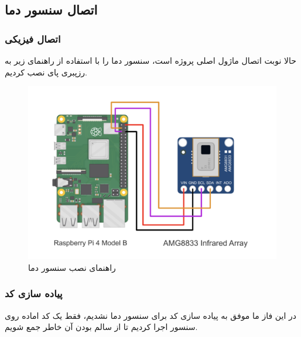 \documentclass[12pt]{article}
\begin{document}
\newpage

\subsection{اتصال سنسور دما}

\subsubsection{اتصال فیزیکی}

حالا نوبت اتصال ماژول اصلی پروژه است، سنسور دما را با استفاده از راهنمای زیر به رزپبری پای نصب کردیم.

\begin{figure}[h]
	\begin{center}
		\includegraphics[width=.75\textwidth]{images/amg8833_RPi4_wiring.png}
	\end{center}
	\caption{راهنمای نصب سنسور دما}
\end{figure}

\subsubsection{پیاده سازی کد}

در این فاز ما موفق به پیاده سازی کد برای سنسور دما نشدیم، فقط یک کد اماده روی سنسور اجرا کردیم تا از سالم بودن آن خاطر جمع شویم.
\end{document}
